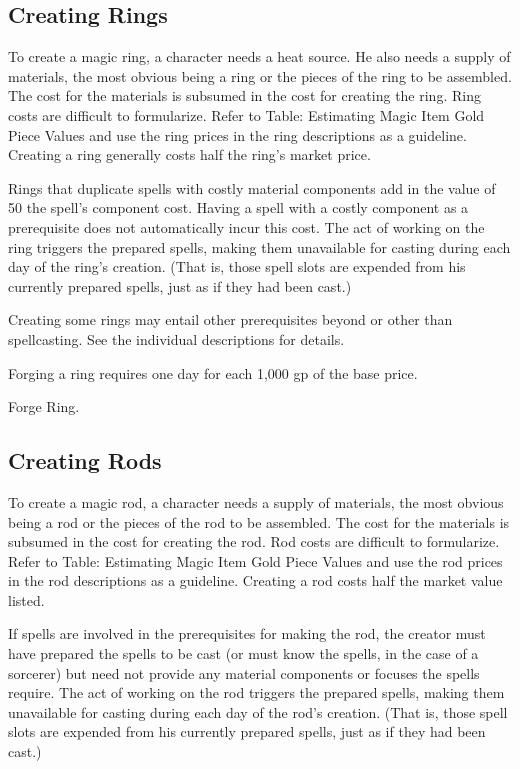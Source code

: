 \subsection{Creating Rings}

To create a magic ring, a character needs a heat source. He also needs a supply of materials, the most obvious being a ring or the pieces of the ring to be assembled. The cost for the materials is subsumed in the cost for creating the ring. Ring costs are difficult to formularize. Refer to Table: Estimating Magic Item Gold Piece Values and use the ring prices in the ring descriptions as a guideline. Creating a ring generally costs half the ring's market price.

Rings that duplicate spells with costly material components add in the value of 50 \mtimes the spell's component cost. Having a spell with a costly component as a prerequisite does not automatically incur this cost. The act of working on the ring triggers the prepared spells, making them unavailable for casting during each day of the ring's creation. (That is, those spell slots are expended from his currently prepared spells, just as if they had been cast.)

Creating some rings may entail other prerequisites beyond or other than spellcasting. See the individual descriptions for details.

Forging a ring requires one day for each 1,000 gp of the base price.

 Forge Ring.

\subsection{Creating Rods}

To create a magic rod, a character needs a supply of materials, the most obvious being a rod or the pieces of the rod to be assembled. The cost for the materials is subsumed in the cost for creating the rod. Rod costs are difficult to formularize. Refer to Table: Estimating Magic Item Gold Piece Values and use the rod prices in the rod descriptions as a guideline. Creating a rod costs half the market value listed.

If spells are involved in the prerequisites for making the rod, the creator must have prepared the spells to be cast (or must know the spells, in the case of a sorcerer) but need not provide any material components or focuses the spells require. The act of working on the rod triggers the prepared spells, making them unavailable for casting during each day of the rod's creation. (That is, those spell slots are expended from his currently prepared spells, just as if they had been cast.)

